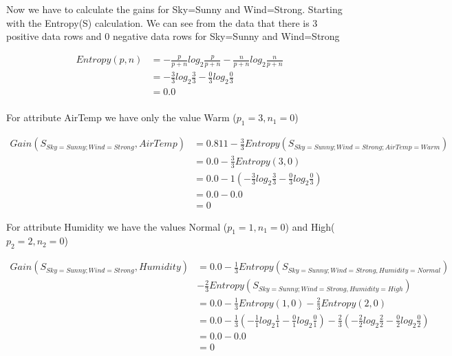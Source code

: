 \documentclass[10pt,a4paper]{article}
\begin{document}
{{{{{{{{{{Now we have to calculate the gains for Sky=Sunny and Wind=Strong. Starting with the Entropy(S) calculation. We can see from the data that there is 3 positive data rows and 0 negative data rows for Sky=Sunny and Wind=Strong 

\begin{equation}
\begin{split}
Entropy(p,n) &=  -\frac{p}{p+n}log_2\frac{p}{p+n} - \frac{n}{p+n}log_2\frac{n}{p+n}  \\
           &= -\frac{3}{3} log_2\frac{3}{3} -\frac{0}{3} log_2\frac{0}{3} \\
           &= 0.0   \\
\end{split}
\end{equation}

For attribute AirTemp we have only the value Warm ($p_1=3,n_1=0$)

\begin{equation}
\begin{split}
Gain(S_{Sky=Sunny;Wind=Strong},AirTemp) &= 0.811 - \frac{3}{3} Entropy(S_{Sky=Sunny;Wind=Strong;AirTemp=Warm} )\\
          &= 0.0 - \frac{3}{3} Entropy(3,0) \\
          &= 0.0 - 1( -\frac{3}{3} log_2\frac{3}{3} -\frac{0}{3} log_2\frac{0}{3} )  \\
          &= 0.0 - 0.0  \\
          &= 0
\end{split}
\end{equation}

For attribute Humidity we have the values Normal ($p_1=1,n_1=0$) and High($p_2=2,n_2=0$)

\begin{equation}
\begin{split}
Gain(S_{Sky=Sunny;Wind=Strong},Humidity) &= 0.0 - \frac{1}{3} Entropy(S_{Sky=Sunny;Wind=Strong,Humidity=Normal} ) \\ &- \frac{2}{3}Entropy(S_{Sky=Sunny;Wind=Strong,Humidity=High}) \\
          &= 0.0 - \frac{1}{3} Entropy(1,0) - \frac{2}{3}Entropy(2,0) \\
          &= 0.0 -\frac{1}{3} ( -\frac{1}{1} log_2\frac{1}{1} -\frac{0}{1} log_2\frac{0}{1} ) - \frac{2}{3}(-\frac{2}{2} log_2\frac{2}{2} - \frac{0}{2}log_2\frac{0}{2} ) \\
          &= 0.0 - 0.0\\
          &= 0 \\
\end{split}
\end{equation}

}}}}}}}}}}
\end{document}

